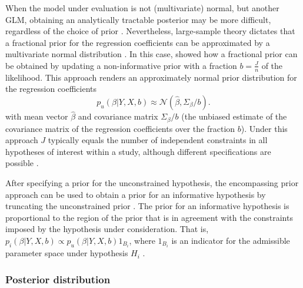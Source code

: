 \documentclass[review, 3p, authoryear]{elsarticle} %
\begin{document}
When the model under evaluation is not (multivariate) normal, but another GLM, obtaining an analytically tractable posterior may be more difficult, regardless of the choice of prior \citep{bda2013}.
Nevertheless, large-sample theory dictates that a fractional prior for the regression coefficients can be approximated by a multivariate normal distribution \citep{bda2013}.
In this case, \citet{gu_approximated_2018} showed how a fractional prior can be obtained by updating a non-informative prior with a fraction \(b = \frac{J}{n}\) of the likelihood.
This approach renders an approximately normal prior distribution for the regression coefficients
\[
p_u(\beta | Y, X, b) \approx \mathcal{N}(\hat{\beta}, \Sigma_\beta / b).
\]
with mean vector \(\hat{\beta}\) and covariance matrix \(\Sigma_{\beta}/b\) (the unbiased estimate of the covariance matrix of the regression coefficients over the fraction \(b\)).
Under this approach \(J\) typically equals the number of independent constraints in all hypotheses of interest within a study, although different specifications are possible \citep[for an elaborate discussion on appropriate values for \(J\), see][]{gu_approximated_2018, hoijtink_prior_2021}.

After specifying a prior for the unconstrained hypothesis, the encompassing prior approach can be used to obtain a prior for an informative hypothesis by truncating the unconstrained prior \citep[e.g.,][]{klugkist_inequality_2005, mulder_equality_2010, mulder_prior_2014}.
The prior for an informative hypothesis is proportional to the region of the prior that is in agreement with the constraints imposed by the hypothesis under consideration.
That is, \(p_i(\beta | Y, X, b) \propto p_u(\beta | Y, X, b)1_{B_i}\), where \(1_{B_i}\) is an indicator for the admissible parameter space under hypothesis \(H_i\) \citep{gu_approximated_2018}.

\hypertarget{posterior-distribution}{%
\subsubsection{Posterior distribution}\label{posterior-distribution}}
\end{document}
